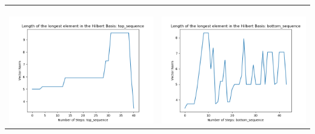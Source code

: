 \documentclass[10pt]{article}
\begin{document}
\begin{tabular}{c|c}
\begin{minipage}{.45\textwidth}
\end{minipage} \\ \\
\hline \\\begin{minipage}{.45\textwidth}
\includegraphics[width=\textwidth]{"DATA/4d/4 generators 2 bound G/top_sequence LENGTH"}
\end{minipage} &
\begin{minipage}{.45\textwidth}
\includegraphics[width=\textwidth]{"DATA/4d/4 generators 2 bound G bottomup/bottom_sequence LENGTH"}
\end{minipage}
\end{tabular}
\end{document}
